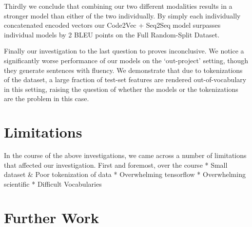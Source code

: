 Thirdly we conclude that combining our two different modalities results in a stronger model than either of the two individually. By simply each individually concatenated encoded vectors our Code2Vec + Seq2Seq model surpasses individual models by 2 BLEU points on the Full Random-Split Dataset.

Finally our investigation to the last question to proves inconclusive. We notice a significantly worse performance of our models on the `out-project' setting, though they generate sentences with fluency. We demonstrate that due to tokenizations of the dataset, a large fraction of test-set features are rendered out-of-vocabulary in this setting, raising the question of whether the models or the tokenizations are the problem in this case. 

\section{Limitations}

In the course of the above investigations, we came across a number of limitations that affected our investigation.
First and foremost, over the course
* Small dataset \& Poor tokenization of data
* Overwhelming tensorflow
* Overwhelming scientific
* Difficult Vocabularies


\section{Further Work}
